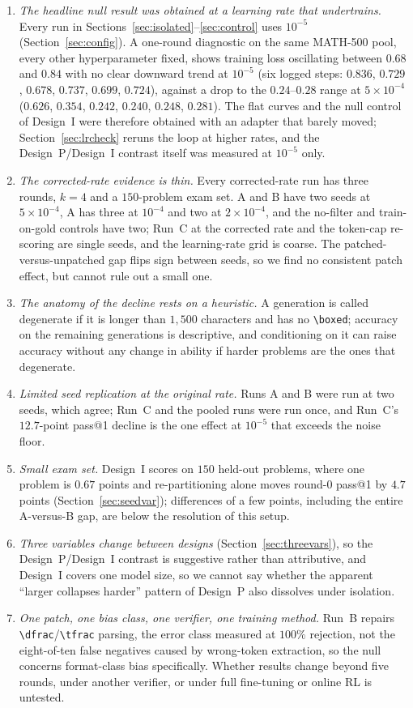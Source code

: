 \documentclass[runningheads]{llncs}
\begin{document}
\begin{enumerate}
\item \emph{The headline null result was obtained at a learning rate that
undertrains.} Every run in Sections~\ref{sec:isolated}--\ref{sec:control} uses
$10^{-5}$ (Section~\ref{sec:config}). A one-round diagnostic on the same MATH-500
pool, every other hyperparameter fixed, shows training loss oscillating between
$0.68$ and $0.84$ with no clear downward trend at $10^{-5}$ (six logged steps:
$0.836$, $0.729$, $0.678$, $0.737$, $0.699$, $0.724$), against a drop to the
$0.24$--$0.28$ range at $5\times10^{-4}$ ($0.626$, $0.354$, $0.242$, $0.240$,
$0.248$, $0.281$). The flat curves and the null control of Design~I were therefore
obtained with an adapter that barely moved; Section~\ref{sec:lrcheck} reruns the
loop at higher rates, and the Design~P/Design~I contrast itself was measured at
$10^{-5}$ only.
\item \emph{The corrected-rate evidence is thin.} Every corrected-rate run has
three rounds, $k=4$ and a $150$-problem exam set. A and B have two seeds at
$5\times10^{-4}$, A has three at $10^{-4}$ and two at $2\times10^{-4}$, and the
no-filter and train-on-gold controls have two; Run~C at the corrected rate and
the token-cap re-scoring are single seeds, and the learning-rate grid is coarse. The patched-versus-unpatched gap flips sign between seeds, so we find no
consistent patch effect, but cannot rule out a small one.
\item \emph{The anatomy of the decline rests on a heuristic.} A generation is
called degenerate if it is longer than $1{,}500$ characters and has no
\verb|\boxed|; accuracy on the remaining generations is descriptive, and
conditioning on it can raise accuracy without any change in ability if harder
problems are the ones that degenerate.
\item \emph{Limited seed replication at the original rate.} Runs A and B were run
at two seeds, which agree; Run~C and the pooled runs were run once, and Run~C's
$12.7$-point pass@1 decline is the one effect at $10^{-5}$ that exceeds the noise
floor.
\item \emph{Small exam set.} Design~I scores on $150$ held-out problems, where one
problem is $0.67$ points and re-partitioning alone moves round-0 pass@1 by $4.7$
points (Section~\ref{sec:seedvar}); differences of a few points, including the
entire A-versus-B gap, are below the resolution of this setup.
\item \emph{Three variables change between designs}
(Section~\ref{sec:threevars}), so the Design~P/Design~I contrast is suggestive
rather than attributive, and Design~I covers one model size, so we cannot say
whether the apparent ``larger collapses harder'' pattern of Design~P also
dissolves under isolation.
\item \emph{One patch, one bias class, one verifier, one training method.} Run~B
repairs \verb|\dfrac|/\verb|\tfrac| parsing, the error class measured at $100\%$
rejection, not the eight-of-ten false negatives caused by wrong-token extraction,
so the null concerns format-class bias specifically. Whether results change beyond
five rounds, under another verifier, or under full fine-tuning or online RL is
untested.
\end{enumerate}
\end{document}
